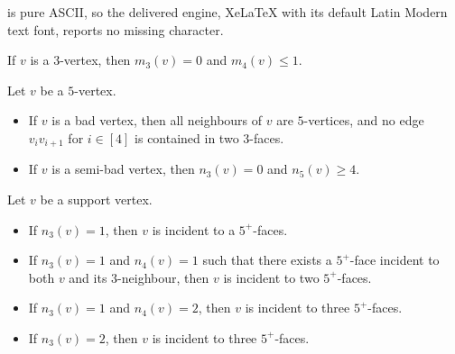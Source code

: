 \documentclass[10pt,a4paper]{amsart}
\begin{document}
is pure ASCII, so the delivered engine, XeLaTeX with its default Latin Modern text font, reports no missing character.
\begin{lemma}\label{lem:faces-in-3-face}
If $v$ is a $3$-vertex, then $m_3(v)=0$ and  $m_4(v)\leq 1$. 
\end{lemma}

\begin{remark}\label{rem:specil vertices} 
Let $v$ be a $5$-vertex.
\begin{itemize}
\item[$(a)$] If $v$ is a bad vertex, then all neighbours of $v$ are $5$-vertices, and no edge $v_iv_{i+1}$ for $i\in [4]$ is contained in two $3$-faces.

\item[$(b)$] If $v$ is a semi-bad vertex, then $n_3(v)=0$ and $n_5(v)\geq 4$. %
%
%
\end{itemize}
\end{remark}

\begin{lemma}\label{lem:support-properties}
Let $v$ be a support vertex. 
\begin{itemize}
\item[$(a)$] If $n_3(v)=1$, then  $v$ is incident to a $5^+$-faces. 
\item[$(b)$] If $n_3(v)=1$ and $n_4(v)=1$ such that there exists a $5^+$-face incident to  both $v$ and its $3$-neighbour, then  $v$ is incident to two $5^+$-faces. 
\item[$(c)$] If $n_3(v)=1$ and $n_4(v)=2$, then  $v$ is incident to three $5^+$-faces. 
\item[$(d)$] If $n_3(v)=2$, then $v$ is incident to three $5^+$-faces. 
\end{itemize}
\end{lemma}
\end{document}
